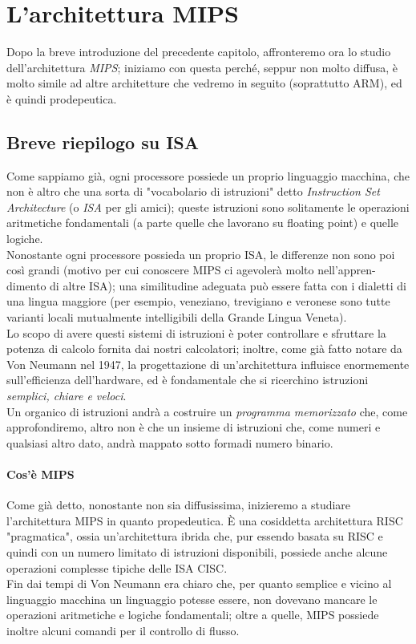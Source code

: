 \documentclass[class=book, crop=false]{standalone}
\begin{document}
\chapter{L'architettura MIPS}

Dopo la breve introduzione del precedente capitolo, affronteremo ora lo studio dell'architettura \textit{MIPS}; iniziamo con questa perché, seppur non molto diffusa, è molto simile ad altre architetture che vedremo in seguito (soprattutto ARM), ed è quindi prodepeutica.

\section{Breve riepilogo su ISA}
Come sappiamo già, ogni processore possiede un proprio linguaggio macchina, che non è altro che una sorta di "vocabolario di istruzioni" detto \emph{Instruction Set Architecture} (o \emph{ISA} per gli amici); queste istruzioni sono solitamente le operazioni aritmetiche fondamentali (a parte quelle che lavorano su floating point) e quelle logiche. \\
Nonostante ogni processore possieda un proprio ISA, le differenze non sono poi così grandi (motivo per cui conoscere MIPS ci agevolerà molto nell'appren-dimento di altre ISA); una similitudine adeguata può essere fatta con i dialetti di una lingua maggiore (per esempio, veneziano, trevigiano e veronese sono tutte varianti locali mutualmente intelligibili della Grande Lingua Veneta).\\
Lo scopo di avere questi sistemi di istruzioni è poter controllare e sfruttare la potenza di calcolo fornita dai nostri calcolatori; inoltre, come già fatto notare da Von Neumann nel 1947, la progettazione di un'architettura influisce enormemente sull'efficienza dell'hardware, ed è fondamentale che si ricerchino istruzioni \textit{semplici, chiare e veloci}.\\
Un organico di istruzioni andrà a costruire un \textit{programma memorizzato} che, come approfondiremo, altro non è che un insieme di istruzioni che, come numeri e qualsiasi altro dato, andrà mappato sotto formadi numero binario.

\subsubsection{Cos'è MIPS}
Come già detto, nonostante non sia diffusissima, inizieremo a studiare l'architettura MIPS in quanto propedeutica. È una cosiddetta architettura RISC "pragmatica", ossia un'architettura ibrida che, pur essendo basata su RISC e quindi con un numero limitato di istruzioni disponibili, possiede anche alcune operazioni complesse tipiche delle ISA CISC.\\
Fin dai tempi di Von Neumann era chiaro che, per quanto semplice e vicino al linguaggio macchina un linguaggio potesse essere, non dovevano mancare le operazioni aritmetiche e logiche fondamentali; oltre a quelle, MIPS possiede inoltre alcuni comandi per il controllo di flusso.
\end{document}
